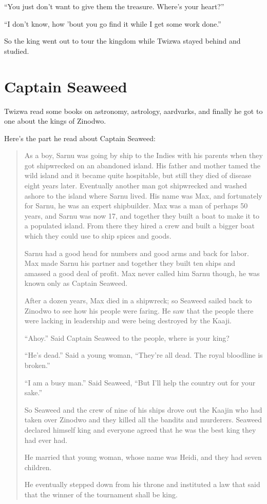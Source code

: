 ``You just don't want to give them the treasure. Where's your heart?''

``I don't know, how 'bout you go find it while I get some work done.''

So the king went out to tour the kingdom while Twizwa stayed behind and studied.

\section{Captain Seaweed}

Twizwa read some books on astronomy, astrology, aardvarks, and finally he got to one about the kings of Zinodwo.

Here's the part he read about Captain Seaweed:

\begin{quote}

As a boy, Sarnu was going by ship to the Indies with his parents when they got shipwrecked on an abandoned island.
His father and mother tamed the wild island and it became quite hospitable, but still they died of disease eight years later.
Eventually another man got shipwrecked and washed ashore to the island where Sarnu lived.
His name was Max, and fortunately for Sarnu, he was an expert shipbuilder.
Max was a man of perhaps 50 years, and Sarnu was now 17, and together they built a boat to make it to a populated island.
From there they hired a crew and built a bigger boat which they could use to ship spices and goods.

Sarnu had a good head for numbers and good arms and back for labor.
Max made Sarnu his partner and together they built ten ships and amassed a good deal of profit.
Max never called him Sarnu though, he was known only as Captain Seaweed.

After a dozen years, Max died in a shipwreck; so Seaweed sailed back to Zinodwo to see how his people were faring.
He saw that the people there were lacking in leadership and were being destroyed by the Kaaji.

``Ahoy.'' Said Captain Seaweed to the people, where is your king?

``He's dead.'' Said a young woman, ``They're all dead. The royal bloodline is broken.''

``I am a busy man.'' Said Seaweed, ``But I'll help the country out for your sake.''

So Seaweed and the crew of nine of his ships drove out the Kaajin who had taken over Zinodwo and they killed all the bandits and murderers. Seaweed declared himself king and everyone agreed that he was the best king they had ever had.

He married that young woman, whose name was Heidi, and they had seven children.

He eventually stepped down from his throne and instituted a law that said that the winner of the tournament shall be king.

\end{quote}

